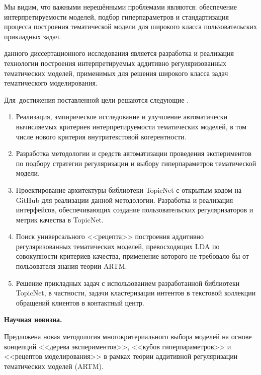 Мы видим, что важными нерешёнными проблемами являются: обеспечение  интерпретируемости моделей, подбор гиперпараметров и стандартизация процесса построения тематической модели для широкого класса пользовательских прикладных задач.

{\aim} данного диссертационного исследования является разработка и реализация технологии построения интерпретируемых аддитивно регуляризованных тематических моделей, применимых для решения широкого класса задач тематического моделирования.

Для~достижения поставленной цели решаются следующие {\tasks}.

\begin{enumerate}[beginpenalty=10000] %

  \item Реализация, эмпирическое исследование и улучшение автоматически вычисляемых критериев интерпретируемости тематических моделей, в том числе нового критерия внутритекстовой когерентности.

  \item Разработка методологии и средств автоматизации проведения экспериментов по подбору стратегии регуляризации и выбору гиперпараметров тематической модели.

  \item Проектирование архитектуры библиотеки TopicNet с открытым кодом на GitHub для реализации данной методологии. Разработка и реализация интерфейсов, обеспечивающих создание пользовательских регуляризаторов и метрик качества в TopicNet.

  \item Поиск универсального <<рецепта>> построения аддитивно регуляризованных тематических моделей, превосходящих LDA по совокупности критериев качества, применение которого не требовало бы от пользователя знания теории ARTM.

  \item Решение прикладных задач с использованием разработанной библиотеки TopicNet, в частности, задачи кластеризации интентов в текстовой коллекции обращений клиентов в контактный центр.

\end{enumerate}

\textbf{Научная новизна.}

Предложена новая методология многокритериального выбора моделей на основе концепций <<дерева экспериментов>>, <<кубов гиперпараметров>> и <<рецептов моделирования>> в рамках теории аддитивной регуляризации тематических моделей (ARTM).

